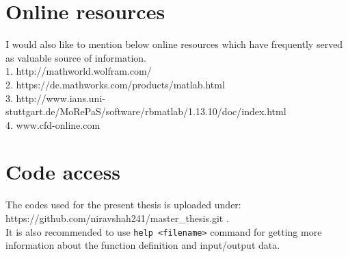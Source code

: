 \documentclass[a4paper,openany]{book}
\begin{document}
\begin{appendices}

\newpage

\section{Online resources}

I would also like to mention below online resources which have frequently served as valuable source of information.
\\
1. http://mathworld.wolfram.com/\\
2. https://de.mathworks.com/products/matlab.html\\
3. http://www.ians.uni-stuttgart.de/MoRePaS/software/rbmatlab/1.13.10/doc/index.html \\
4. www.cfd-online.com\\

\section{Code access}

The codes used for the present thesis is uploaded under: \\
https://github.com/niravshah241/master\_thesis.git .\\

It is also recommended to use \verb|help <filename>| command for getting more information about the function definition and input/output data.

\end{appendices}




\end{document}
